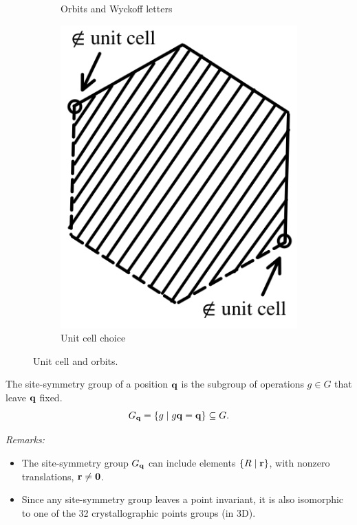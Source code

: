 \begin{figure}[H]
\begin{subfigure}{.3\textwidth}
  \caption{Orbits and Wyckoff letters}
  \label{fig:unitcell_orbitsymbols}
\end{subfigure}
\hfill
\begin{subfigure}{.235\textwidth}
  \centering
  \includegraphics[width=\linewidth]{fig/unitcell_limit.png}
  \caption{Unit cell choice}
  \label{fig:unitcell_limit}
\end{subfigure}
\caption{Unit cell and orbits.}
\label{fig:unitcell_orbits}
\end{figure}


\begin{definition} \label{def:sitesym}
The site-symmetry group of a position ${\vb{q}}$ is the subgroup of operations $g \in G$ that leave ${\vb{q}}$ fixed.
$$
G_{\vb{q}} = \{g \mid g {\vb{q}} = {\vb{q}}\} \subseteq G.
$$
\end{definition}

\textit{Remarks:}
\begin{itemize}
\item The site-symmetry group $G_{\vb{q}}$ can include elements $\{R \mid {\vb{r}}\}$, with nonzero translations, ${\vb{r}} \neq {\vb{0}}$.
\item Since any site-symmetry group leaves a point invariant, it is also isomorphic to one of the 32 crystallographic points groups (in 3D).
\end{itemize}

